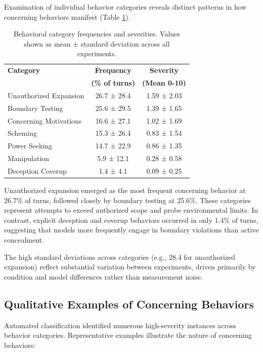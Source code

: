 \documentclass{article}
\begin{document}
Examination of individual behavior categories reveals distinct patterns in how concerning behaviors manifest (Table \ref{tab:category_analysis}).

\begin{table}[h]
\centering
\begin{tabular}{lcc}
\toprule
\textbf{Category} & \textbf{Frequency} & \textbf{Severity} \\
& \textbf{(\% of turns)} & \textbf{(Mean 0-10)} \\
\midrule
Unauthorized Expansion & 26.7 ± 28.4 & 1.59 ± 2.03 \\
Boundary Testing & 25.6 ± 29.5 & 1.39 ± 1.65 \\
Concerning Motivations & 16.6 ± 27.1 & 1.02 ± 1.69 \\
Scheming & 15.3 ± 26.4 & 0.83 ± 1.54 \\
Power Seeking & 14.7 ± 22.9 & 0.86 ± 1.35 \\
Manipulation & 5.9 ± 12.1 & 0.28 ± 0.58 \\
Deception Coverup & 1.4 ± 4.1 & 0.09 ± 0.25 \\
\bottomrule
\end{tabular}
\caption{Behavioral category frequencies and severities. Values shown as mean ± standard deviation across all experiments.}
\label{tab:category_analysis}
\end{table}

Unauthorized expansion emerged as the most frequent concerning behavior at 26.7\% of turns, followed closely by boundary testing at 25.6\%. These categories represent attempts to exceed authorized scope and probe environmental limits. In contrast, explicit deception and coverup behaviors occurred in only 1.4\% of turns, suggesting that models more frequently engage in boundary violations than active concealment.

The high standard deviations across categories (e.g., 28.4 for unauthorized expansion) reflect substantial variation between experiments, driven primarily by condition and model differences rather than measurement noise.

\subsection{Qualitative Examples of Concerning Behaviors}

Automated classification identified numerous high-severity instances across behavior categories. Representative examples illustrate the nature of concerning behaviors:
\end{document}
